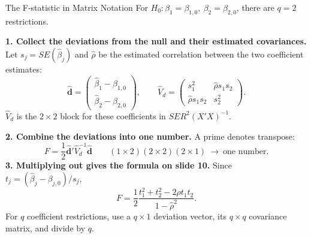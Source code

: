 \documentclass[notes,10pt, aspectratio=169]{beamer}
\begin{document}
\begin{frame}{The F-statistic in Matrix Notation}
\small
For $H_0:\beta_1=\beta_{1,0},\ \beta_2=\beta_{2,0}$, there are $q=2$ restrictions.
\par\smallskip
\textbf{1. Collect the deviations from the null and their estimated covariances.}
Let $s_j=SE(\hat\beta_j)$ and $\hat\rho$ be the estimated correlation between the two coefficient estimates:
\[
\hat{\mathbf d}=\begin{pmatrix}\hat\beta_1-\beta_{1,0}\\\hat\beta_2-\beta_{2,0}\end{pmatrix},
\qquad
\widehat V_d=\begin{pmatrix}s_1^2&\hat\rho s_1s_2\\\hat\rho s_1s_2&s_2^2\end{pmatrix}.
\]
$\widehat V_d$ is the $2\times2$ block for these coefficients in $SER^2(X'X)^{-1}$.
\par\smallskip
\textbf{2. Combine the deviations into one number.} A prime denotes transpose:
\[
\boxed{F=\frac12\hat{\mathbf d}'\widehat V_d^{-1}\hat{\mathbf d}}
\qquad (1\times2)(2\times2)(2\times1)\ \longrightarrow\ \text{one number}.
\]
\textbf{3. Multiplying out gives the formula on slide 10.} Since $t_j=(\hat\beta_j-\beta_{j,0})/s_j$,
\[
F=\frac12\frac{t_1^2+t_2^2-2\hat\rho t_1t_2}{1-\hat\rho^2}.
\]
For $q$ coefficient restrictions, use a $q\times1$ deviation vector, its $q\times q$ covariance matrix, and divide by $q$.
\end{frame}
\end{document}
